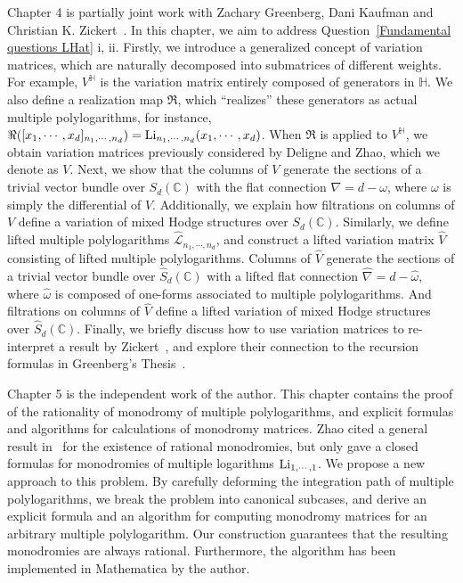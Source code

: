 Chapter 4 is partially joint work with Zachary Greenberg, Dani Kaufman and Christian K. Zickert~\cite{ZDHZ_HopfAlgebrasOfMultiplePolylogarithmsAndHolomorphicOneForms}. In this chapter, we aim to address Question~\ref{Fundamental questions LHat} i, ii. Firstly, we introduce a generalized concept of variation matrices, which are naturally decomposed into submatrices of different weights. For example, $V^{\mathbb H}$ is the variation matrix entirely composed of generators in $\mathbb H$. We also define a realization map $\Re$, which ``realizes'' these generators as actual multiple polylogarithms, for instance, $\Re([x_1,\cdots,x_d]_{n_1,\cdots,n_d})=\operatorname{Li}_{n_1,\cdots,n_d}(x_1,\cdots,x_d)$. When $\Re$ is applied to $V^{\mathbb H}$, we obtain variation matrices previously considered by Deligne and Zhao, which we denote as $V$. Next, we show that the columns of $V$ generate the sections of a trivial vector bundle over $S_d(\mathbb C)$ with the flat connection $\nabla=d-\omega$, where $\omega$ is simply the differential of $V$. Additionally, we explain how filtrations on columns of $V$ define a variation of mixed Hodge structures over $S_d(\mathbb C)$. Similarly, we define lifted multiple polylogarithms $\widehat{\mathcal L}_{n_1,\cdots,n_d}$, and construct a lifted variation matrix $\widehat V$ consisting of lifted multiple polylogarithms. Columns of $\widehat V$ generate the sections of a trivial vector bundle over $\widehat S_d(\mathbb C)$ with a lifted flat connection $\widehat\nabla=d-\widehat\omega$, where $\widehat\omega$ is composed of one-forms associated to multiple polylogarithms. And filtrations on columns of $\widehat V$ define a lifted variation of mixed Hodge structures over $\widehat S_d(\mathbb C)$. Finally, we briefly discuss how to use variation matrices to re-interpret a result by Zickert~\cite{Zickert_HolomorphicPolylogarithmsAndBlochComplexes}, and explore their connection to the recursion formulas in Greenberg's Thesis~\cite{ZackThesis}.

Chapter 5 is the independent work of the author. This chapter contains the proof of the rationality of monodromy of multiple polylogarithms, and explicit formulas and algorithms for calculations of monodromy matrices. Zhao cited a general result in~\cite{DeligneGoncharov_GroupesFondamentauxMotiviquesDeTateMixte} for the existence of rational monodromies, but only gave a closed formulas for monodromies of multiple logarithms $\operatorname{Li}_{1,\cdots,1}$. We propose a new approach to this problem. By carefully deforming the integration path of multiple polylogarithms, we break the problem into canonical subcases, and derive an explicit formula and an algorithm for computing monodromy matrices for an arbitrary multiple polylogarithm. Our construction guarantees that the resulting monodromies are always rational. Furthermore, the algorithm has been implemented in Mathematica by the author.